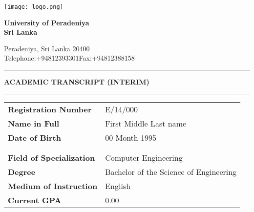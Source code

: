 \documentclass[12pt]{article}
\begin{document}
\noindent
\begin{minipage}[H]{0.17\linewidth}
\centering
\texttt{[image: logo.png]}
\end{minipage}%
\hfill
  \begin{minipage}[H]{0.8\linewidth}
{\fontsize{28}{30}\selectfont \textbf{University of Peradeniya\\Sri Lanka}}

\Large Peradeniya, Sri Lanka 20400\\
{\fontsize{12}{30}\selectfont Telephone:+94812393301\hfill Fax:+94812388158}


  \end{minipage}

\vspace{10pt}
\noindent\rule{\textwidth}{1pt}
\vspace{-15pt}
\begin{center}
{\fontsize{21}{30}\selectfont \textbf{ACADEMIC TRANSCRIPT (INTERIM)}}
\end{center}

\vspace{-12.5pt}

\noindent\rule{\textwidth}{1pt}

\begin{table}[H]
\begin{tabularx}{\textwidth}{Xl}
\textbf{Registration Number} & E/14/000 \\
\textbf{Name in Full} & First Middle Last name \\
\textbf{Date of Birth} & 00 Month 1995 \\
\\
\\

\textbf{Field of Specialization} & Computer Engineering \\
\textbf{Degree} & Bachelor of the Science of Engineering \\
\textbf{Medium of Instruction} & English \\
\textbf{Current GPA} & 0.00 \\
\end{tabularx}
\end{table}

\vspace{-15pt}
\end{document}
